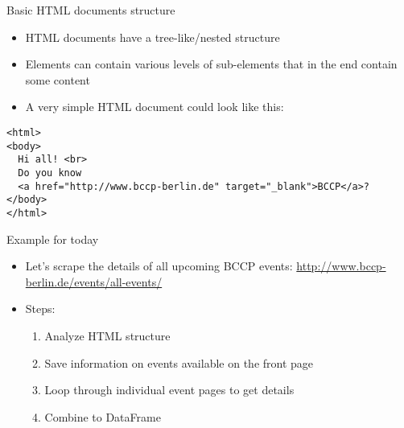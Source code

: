\begin{frame}[fragile]{Basic HTML documents structure}
\begin{itemize}
	\item HTML documents have a tree-like/nested structure
	\item Elements can contain various levels of sub-elements that in the end contain some content
	\item A very simple HTML document could look like this:
\end{itemize}
\begin{verbatim}
<html>
<body>
  Hi all! <br>
  Do you know 
  <a href="http://www.bccp-berlin.de" target="_blank">BCCP</a>?
</body>
</html>
\end{verbatim}
\end{frame}

\begin{frame}{Example for today}
\begin{itemize}
	\item Let's scrape the details of all upcoming BCCP events: \url{http://www.bccp-berlin.de/events/all-events/}
	\item Steps:
		\begin{enumerate}
			\item Analyze HTML structure
			\item Save information on events available on the front page
			\item Loop through individual event pages to get details
			\item Combine to DataFrame
		\end{enumerate}
\end{itemize}
\end{frame}